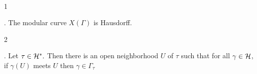 \begin{cor} \ 

 \begin{rm}1\end{rm}. The modular curve $X(\Gamma)$ is Hausdorff.
 
 \begin{rm}2\end{rm}. Let $\tau\in\mathcal{H}^*.$ Then there is an open neighborhood $U$ of $\tau$ such that for all $\gamma\in\mathcal{H}$, if $\gamma(U)$ meets $U$ then $\gamma\in\Gamma_\tau$
\end{cor}







